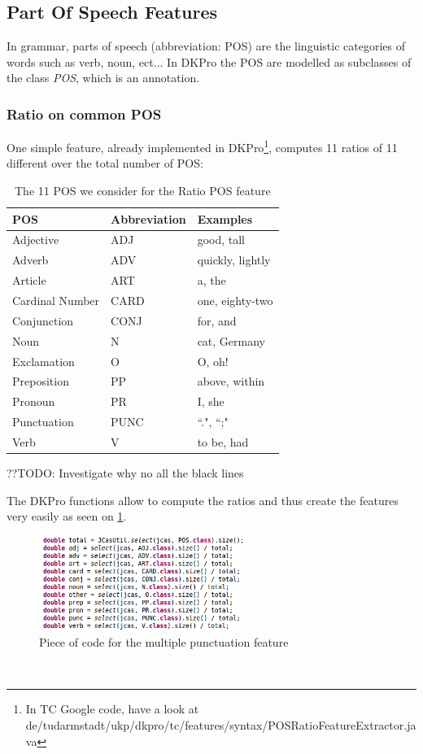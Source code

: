 \subsection{Part Of Speech Features}
In grammar, parts of speech (abbreviation: POS) are the linguistic categories of words such as verb, noun, ect... In DKPro the POS are modelled as subclasses of the class \emph{POS}, which is an annotation. 

\subsubsection{Ratio on common POS}
One simple feature, already implemented in DKPro\footnote{In TC Google code, have a look at de/tudarmstadt/ukp/dkpro/tc/features/syntax/POSRatioFeatureExtractor.java}, computes 11 ratios of 11 different over the total number of POS:

\begin{table}[h]
\center
\begin{tabular}{|l|l|l|}
\hline
\rowcolor[HTML]{9B9B9B} 
POS             & Abbreviation & Examples         \\ \hline
Adjective       & ADJ          & good, tall       \\ \hline
Adverb          & ADV          & quickly, lightly \\ \hline
Article         & ART          & a, the           \\ \hline
Cardinal Number & CARD         & one, eighty-two  \\ \hline
Conjunction     & CONJ         & for, and         \\ \hline
Noun            & N            & cat, Germany     \\ \hline
Exclamation     & O            & O, oh!           \\ \hline
Preposition     & PP           & above, within    \\ \hline
Pronoun         & PR           & I, she           \\ \hline
Punctuation     & PUNC         & ``.", ``;"       \\ \hline
Verb            & V            & to be, had       \\ \hline
\end{tabular}
\caption{\label{11pos} The 11 POS we consider for the Ratio POS feature}
\end{table}

??TODO: Investigate why no all the black lines

The DKPro functions allow to compute the ratios and thus create the features very easily as seen on \cref{fig:11poscode}.
\
\begin{figure}[H]
    \centering
    \includegraphics[width=0.6\textwidth]{fig/11pos.png}
    \caption[Short caption]{Piece of code for the multiple punctuation feature}
    \label{fig:11poscode}
\end{figure}
\
